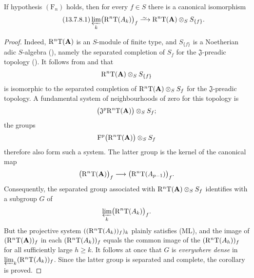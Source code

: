 \begin{corollary}[13.7.8]
\label{0.13.7.8}
If hypothesis $(\mathrm{F}_n)$ holds, then for every $f\in S$ there
is a canonical isomorphism
\begin{equation}
\label{0.13.7.8.1}
\tag{13.7.8.1}
  \varprojlim_k\bigl(\RR^n\mathrm{T}(A_k)\bigr)_f
  \isoto
  \RR^n\mathrm{T}(\bb{A})\otimes_S S_{\{f\}}.
\end{equation}
\end{corollary}

\begin{proof}
Indeed, $\mathrm{R}^n\mathrm{T}(\mathbf{A})$ is an $S$-module of finite type,
and $S_{\{f\}}$ is a Noetherian adic $S$-algebra
(), namely the separated
completion of $S_f$ for the $\mathfrak{J}$-preadic topology
().
It follows from  and
 that
\[
  \mathrm{R}^n\mathrm{T}(\mathbf{A})\otimes_S S_{\{f\}}
\]
is isomorphic to the separated completion of
$\mathrm{R}^n\mathrm{T}(\mathbf{A})\otimes_S S_f$ for the
$\mathfrak{J}$-preadic topology.
A fundamental system of neighbourhoods of zero for this topology
is
\[
  \bigl(
    \mathfrak{J}^p\mathrm{R}^n\mathrm{T}(\mathbf{A})
  \bigr)\otimes_S S_f;
\]
the groups
\[
  \mathrm{F}^p\bigl(\mathrm{R}^n\mathrm{T}(\mathbf{A})\bigr)
  \otimes_S S_f
\]
therefore also form such a system.
The latter group is the kernel of the canonical map
\[
  \bigl(\mathrm{R}^n\mathrm{T}(\mathbf{A})\bigr)_f
  \longrightarrow
  \bigl(\mathrm{R}^n\mathrm{T}(A_{p-1})\bigr)_f.
\]
Consequently, the separated group associated with
$\mathrm{R}^n\mathrm{T}(\mathbf{A})\otimes_S S_f$ identifies with a subgroup
$G$ of
\[
  \varprojlim_k\bigl(\mathrm{R}^n\mathrm{T}(A_k)\bigr)_f.
\]
But the projective system
$((\mathrm{R}^n\mathrm{T}(A_k))_f)_k$ plainly satisfies {\rm(ML)}, and the
image of $(\mathrm{R}^n\mathrm{T}(\mathbf{A}))_f$ in each
$(\mathrm{R}^n\mathrm{T}(A_k))_f$ equals the common image of the
$(\mathrm{R}^n\mathrm{T}(A_h))_f$ for all sufficiently large $h\geq k$.
It follows at once that $G$ is \emph{everywhere dense} in
$\varprojlim_k(\mathrm{R}^n\mathrm{T}(A_k))_f$.
Since the latter group is separated and complete, the corollary is
proved.
\end{proof}
